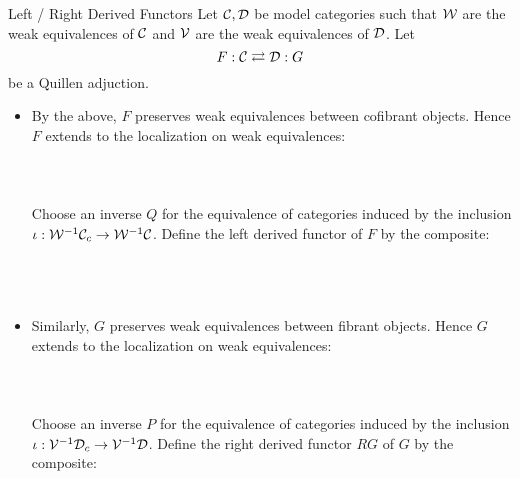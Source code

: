\documentclass[a4paper]{article}
\begin{document}
\begin{defn}{Left / Right Derived Functors}{} Let $\mathcal{C},\mathcal{D}$ be model categories such that $\mathcal{W}$ are the weak equivalences of $\mathcal{C}$ and $\mathcal{V}$ are the weak equivalences of $\mathcal{D}$. Let $$F:\mathcal{C}\rightleftarrows\mathcal{D}:G$$ be a Quillen adjuction. 
\begin{itemize}
\item By the above, $F$ preserves weak equivalences between cofibrant objects. Hence $F$ extends to the localization on weak equivalences: \\~\\
\\~\\ 
Choose an inverse $Q$ for the equivalence of categories induced by the inclusion $\iota:\mathcal{W}^{-1}\mathcal{C}_c\to\mathcal{W}^{-1}\mathcal{C}$. Define the left derived functor of $F$ by the composite: \\~\\
\\~\\ 
\item Similarly, $G$ preserves weak equivalences between fibrant objects. Hence $G$ extends to the localization on weak equivalences: \\~\\
\\~\\ 
Choose an inverse $P$ for the equivalence of categories induced by the inclusion $\iota:\mathcal{V}^{-1}\mathcal{D}_c\to\mathcal{V}^{-1}\mathcal{D}$. Define the right derived functor $RG$ of $G$ by the composite: \\~\\
\\~\\ 
\end{itemize}
\end{defn}
\end{document}
